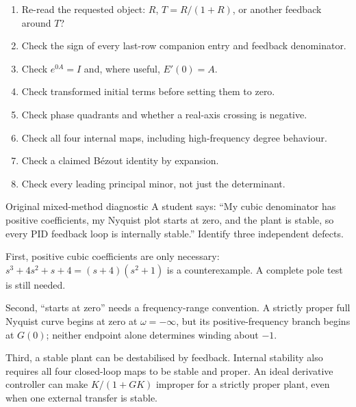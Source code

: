\begin{tip}
\begin{enumerate}
\item Re-read the requested object: $R$, $T=R/(1+R)$, or another feedback around $T$?
\item Check the sign of every last-row companion entry and feedback denominator.
\item Check $e^{0A}=I$ and, where useful, $E'(0)=A$.
\item Check transformed initial terms before setting them to zero.
\item Check phase quadrants and whether a real-axis crossing is negative.
\item Check all four internal maps, including high-frequency degree behaviour.
\item Check a claimed B\'ezout identity by expansion.
\item Check every leading principal minor, not just the determinant.
\end{enumerate}
\end{tip}
\begin{question}{Original mixed-method diagnostic}
A student says: ``My cubic denominator has positive coefficients, my Nyquist plot starts at zero, and the plant is stable, so every PID feedback loop is internally stable.'' Identify three independent defects.
\end{question}
\begin{answer}
First, positive cubic coefficients are only necessary: $s^3+4s^2+s+4=(s+4)(s^2+1)$ is a counterexample. A complete pole test is still needed.

Second, ``starts at zero'' needs a frequency-range convention. A strictly proper full Nyquist curve begins at zero at $\omega=-\infty$, but its positive-frequency branch begins at $G(0)$; neither endpoint alone determines winding about $-1$.

Third, a stable plant can be destabilised by feedback. Internal stability also requires all four closed-loop maps to be stable and proper. An ideal derivative controller can make $K/(1+GK)$ improper for a strictly proper plant, even when one external transfer is stable.
\end{answer}

